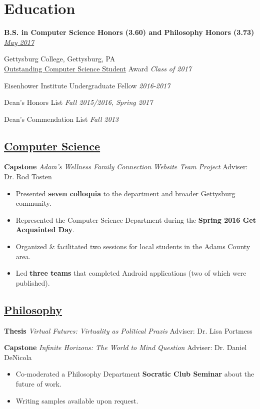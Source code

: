 \documentclass[11pt]{article}
\begin{document}
\section*{Education}
\textbf{\large{B.S. in Computer Science {\footnotesize Honors (3.60)} and Philosophy {\footnotesize Honors (3.73)}}}
\hfill
\href{https://www.gettysburg.edu/commencement/2017/pdfs/2017\%20Commencement\%20Program\%20FINAL.pdf}{\textit{May 2017}}


Gettysburg College, Gettysburg, PA \\

\href{https://www.gettysburg.edu/academic-programs/computer-science/programs/honors-programs}{Outstanding Computer Science Student} Award \hfill \textit{Class of 2017}

Eisenhower Institute Undergraduate Fellow 
\hfill
\textit{2016-2017}

Dean's Honors List \hfill \textit{Fall 2015/2016, Spring 2017}

Dean's Commendation List \hfill \textit{Fall 2013}

\subsection*{\underline{Computer Science}}
\textbf{Capstone} \textit{Adam's Wellness Family Connection Website Team Project} \hfill Adviser: Dr. Rod Tosten
\begin{itemize}[noitemsep]
	\item Presented \textbf{seven colloquia} to the department and broader Gettysburg community.
	\item Represented the Computer Science Department during the \textbf{Spring 2016 Get Acquainted Day}. 
	\item Organized \& facilitated two  sessions for local students in the Adams County area.
	\item Led \textbf{three teams} that completed Android applications (two of which were published).
\end{itemize}

\subsection*{\underline{Philosophy}}
\textbf{Thesis} \textit{Virtual Futures: Virtuality as Political Praxis} \hfill Adviser: Dr. Lisa Portmess

\textbf{Capstone} \textit{Infinite Horizons: The World to Mind Question} \hfill Adviser: Dr. Daniel DeNicola
\begin{itemize}[noitemsep]
	\item Co-moderated a Philosophy Department \textbf{Socratic Club Seminar} about the future of work.
	\item Writing samples available upon request.
\end{itemize}
\end{document}
